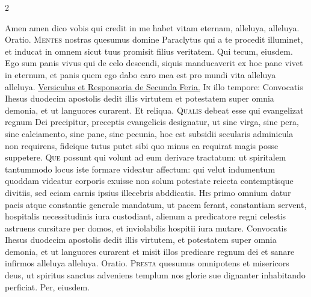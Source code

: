 \begin{multicols*}{2}
\begin{responsory-final}
\end{responsory-final}%
 Amen amen dico vobis qui credit in me habet vitam eternam, alleluya, alleluya. {\color{Red} Oratio.}
\lettrine[lines=2]{\zallmancaps \color{Blue} M}{entes} nostras quesumus domine Paraclytus qui a te procedit illuminet, et inducat in omnem sicut tuus promisit filius veritatem. Qui tecum, eiusdem.
 Ego sum panis vivus qui de celo descendi, siquis manducaverit ex hoc pane vivet in eternum, et panis quem ego dabo caro mea est pro mundi vita alleluya alleluya.
 \ul{Versiculus et Responsoria de Secunda Feria.}
\lettrine[lines=2]{\zallmancaps \color{Red} I}{n} illo tempore: Convocatis Ihesus duodecim apostolis dedit illis virtutem et potestatem super omnia demonia, et ut languores curarent. Et reliqua.
\lettrine[lines=2]{\zallmancaps \color{Blue} Q}{ualis} debeat esse qui evangelizat regnum Dei precipitur, preceptis evangelicis designatur, ut sine virga, sine pera, sine calciamento, sine pane, sine pecunia, hoc est subsidii secularis adminicula non requirens, fideique tutus putet sibi quo minus ea requirat magis posse suppetere.
\lettrine[lines=2]{\zallmancaps \color{Red} Q}{ue} possunt qui volunt ad eum derivare tractatum: ut spiritalem tantummodo locus iste formare videatur affectum: qui velut indumentum quoddam videatur corporis exuisse non solum potestate reiecta contemptisque divitiis, sed eciam carnis ipsius illecebris abddicatis.
\lettrine[lines=2]{\zallmancaps \color{Blue} H}{is} primo omnium datur pacis atque constantie generale mandatum, ut pacem ferant, constantiam servent, hospitalis necessitudinis iura custodiant, alienum a predicatore regni celestis astruens cursitare per domos, et inviolabilis hospitii iura mutare.
 Convocatis Ihesus duodecim apostolis dedit illis virtutem, et potestatem super omnia demonia, et ut languores curarent et misit illos predicare regnum dei et sanare infirmos alleluya alleluya. {\color{Red} Oratio.}
\lettrine[lines=2]{\zallmancaps \color{Red} P}{resta} quesumus omnipotens et misericors deus, ut spiritus sanctus adveniens templum nos glorie sue dignanter inhabitando perficiat. Per, eiusdem.

\end{multicols*}
